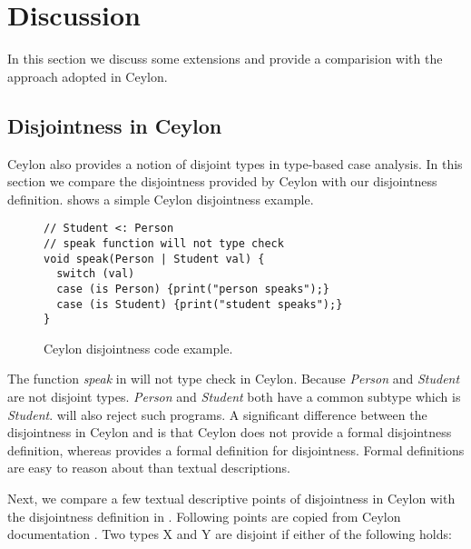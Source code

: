 \section{Discussion}
\label{sec:discussion}
In this section we discuss some extensions and provide a comparision with the approach
adopted in Ceylon.

\subsection{Disjointness in Ceylon}
\label{sec:discussion:ceylon}


 
Ceylon also provides a notion of disjoint types in type-based case analysis. In this section
we compare the disjointness provided by Ceylon with our disjointness definition.
 shows a simple Ceylon disjointness example.


\begin{figure}[t]
\begin{lstlisting}[xleftmargin=.2\textwidth, xrightmargin=.2\textwidth]
// Student <: Person
// speak function will not type check
void speak(Person | Student val) {
  switch (val)
  case (is Person) {print("person speaks");}
  case (is Student) {print("student speaks");} 
}
\end{lstlisting}
\caption{Ceylon disjointness code example.}
\label{discussion:list:ceylon}
\end{figure}

\noindent The function \emph{speak} in  
will not type check in Ceylon. Because \emph{Person} and
\emph{Student} are not disjoint types. \emph{Person} and \emph{Student} both have a common
subtype which is \emph{Student}. \cal will also reject such programs.
A significant difference between the disjointness in Ceylon and \cal is that
Ceylon does not provide
a formal disjointness definition, whereas \cal provides a formal definition for
disjointness. Formal definitions are easy to reason about than textual descriptions. 

Next, we compare a few textual descriptive points of disjointness in Ceylon with
the disjointness definition in \cal. Following points are copied from Ceylon
documentation \cite{}. Two types X and Y are disjoint if either of the following holds:

